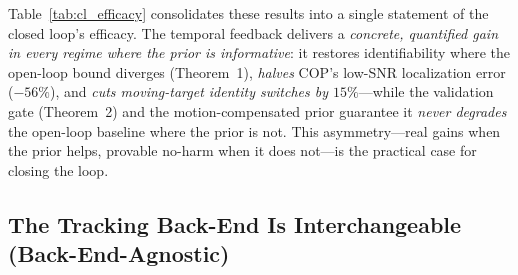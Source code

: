 \documentclass[journal]{IEEEtran}
\begin{document}
Table~\ref{tab:cl_efficacy} consolidates these results into a single statement of
the closed loop's efficacy. The temporal feedback delivers a \emph{concrete,
quantified gain in every regime where the prior is informative}: it restores
identifiability where the open-loop bound diverges (Theorem~1), \emph{halves}
COP's low-SNR localization error ($-56\%$), and \emph{cuts moving-target identity
switches by $15\%$}---while the validation gate (Theorem~2) and the
motion-compensated prior guarantee it \emph{never degrades} the open-loop baseline
where the prior is not. This asymmetry---real gains when the prior helps, provable
no-harm when it does not---is the practical case for closing the loop.

\begin{table}[t]
\centering
\caption{Operating guide: the best front-end and the closed loop's (gated) effect
by regime, consolidating the efficacy and regime summaries. Quantified gains carry
$95\%$ CIs and are substantiated in the cited theorem/section; the gate guarantees
no degradation where the prior is uninformative.}
\label{tab:cl_efficacy}
\small
{}
\end{table}

\subsection{The Tracking Back-End Is Interchangeable (Back-End-Agnostic)}
\label{sec:exp_cross}
\end{document}
